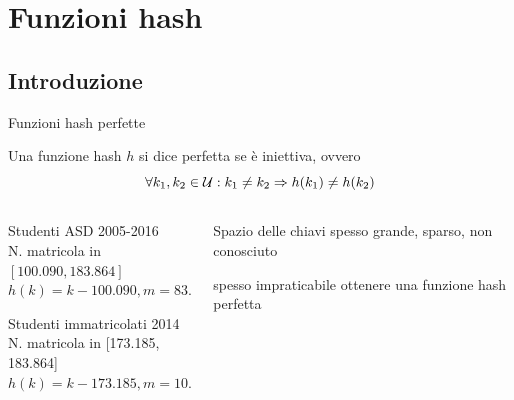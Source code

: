 \section{Funzioni hash}

\subsection{Introduzione}

\begin{frame}{Funzioni hash perfette}

\vspace{-6pt}
\begin{myboxtitle}[Definizione]
Una funzione hash $h$ si dice \alert{perfetta} se è \alert{iniettiva}, ovvero
\[
\forall k_1, k_2 \in {\cal U}: k_1 \neq k_2 \Rightarrow h(k_1) \neq h(k_2)
\]
\end{myboxtitle}

\vspace{-9pt}
\begin{columns}[T]
\begin{column}{0.55\textwidth}
\BIL
\item Studenti ASD 2005-2016\\ N. matricola in $[100.090, 183.864]$\\[6pt]
\(
  h(k) = k - 100.090, m = 83.774
\)
\item Studenti immatricolati 2014\\ N. matricola in [173.185, 183.864]\\[6pt]
\(
h(k) = k - 173.185, m = 10.679
\)
\EIL
\end{column}
\hfill
\begin{column}{0.40\textwidth}
\BIL
\item Spazio delle chiavi spesso grande, sparso, non conosciuto
\item \EE spesso impraticabile ottenere una funzione hash perfetta
\EIL
\end{column}
\end{columns}

\end{frame}



